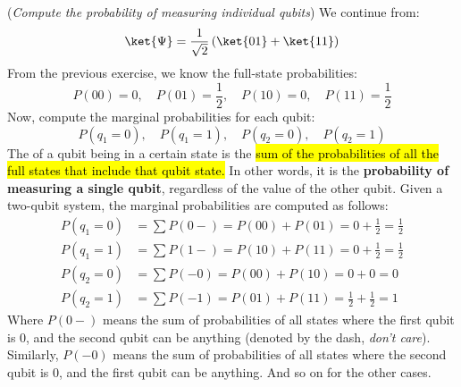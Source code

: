 \highspace
\exercise (\emph{Compute the probability of measuring individual qubits}) We continue from:
\begin{equation*}
    \ket{\Psi} = \frac{1}{\sqrt{2}}\left(\ket{01} + \ket{11}\right)
\end{equation*}
From the previous exercise, we know the full-state probabilities:
\begin{equation*}
    P(00)=0, \quad P(01)=\frac{1}{2}, \quad P(10)=0, \quad P(11)=\frac{1}{2}
\end{equation*}
Now, compute the marginal probabilities for each qubit:
\begin{equation*}
    P(q_1=0), \quad P(q_1=1), \quad P(q_2=0), \quad P(q_2=1)
\end{equation*}
\solution The  of a qubit being in a certain state is the \hl{sum of the probabilities of all the full states that include that qubit state.} In other words, it is the \textbf{probability of measuring a single qubit}, regardless of the value of the other qubit. Given a two-qubit system, the marginal probabilities are computed as follows:
\begin{equation*}
    \begin{aligned}
        P(q_1=0) &= \sum P(0-) = P(00) + P(01) = 0 + \frac{1}{2} = \frac{1}{2} \\
        P(q_1=1) &= \sum P(1-) = P(10) + P(11) = 0 + \frac{1}{2} = \frac{1}{2} \\
        P(q_2=0) &= \sum P(-0) = P(00) + P(10) = 0 + 0 = 0 \\
        P(q_2=1) &= \sum P(-1) = P(01) + P(11) = \frac{1}{2} + \frac{1}{2} = 1
    \end{aligned}
\end{equation*}
Where $P(0-)$ means the sum of probabilities of all states where the first qubit is 0, and the second qubit can be anything (denoted by the dash, \emph{don't care}). Similarly, $P(-0)$ means the sum of probabilities of all states where the second qubit is 0, and the first qubit can be anything. And so on for the other cases.